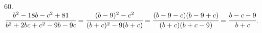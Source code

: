 60. $\cfrac{b^2-18b-c^2+81}{b^2+2bc+c^2-9b-9c}=\cfrac{(b-9)^2-c^2}{(b+c)^2-9(b+c)}=\cfrac{(b-9-c)(b-9+c)}{(b+c)(b+c-9)}=\cfrac{b-c-9}{b+c}.$\\

